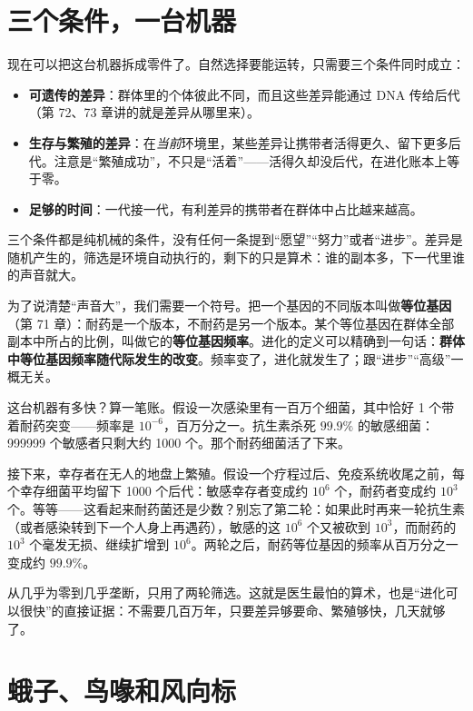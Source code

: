 \section{三个条件，一台机器}

现在可以把这台机器拆成零件了。自然选择要能运转，只需要三个条件同时成立：

\begin{itemize}[itemsep=2pt]
\item \textbf{可遗传的差异}：群体里的个体彼此不同，而且这些差异能通过 DNA 传给后代（第 72、73 章讲的就是差异从哪里来）。
\item \textbf{生存与繁殖的差异}：在\emph{当前}环境里，某些差异让携带者活得更久、留下更多后代。注意是“繁殖成功”，不只是“活着”——活得久却没后代，在进化账本上等于零。
\item \textbf{足够的时间}：一代接一代，有利差异的携带者在群体中占比越来越高。
\end{itemize}

三个条件都是纯机械的条件，没有任何一条提到“愿望”“努力”或者“进步”。差异是随机产生的，筛选是环境自动执行的，剩下的只是算术：谁的副本多，下一代里谁的声音就大。

为了说清楚“声音大”，我们需要一个符号。把一个基因的不同版本叫做\textbf{等位基因}（第 71 章）：耐药是一个版本，不耐药是另一个版本。某个等位基因在群体全部副本中所占的比例，叫做它的\textbf{等位基因频率}。进化的定义可以精确到一句话：\textbf{群体中等位基因频率随代际发生的改变}。频率变了，进化就发生了；跟“进步”“高级”一概无关。

\begin{qiaoliang}
这台机器有多快？算一笔账。假设一次感染里有一百万个细菌，其中恰好 1 个带着耐药突变——频率是 $10^{-6}$，百万分之一。抗生素杀死 $99.9\%$ 的敏感细菌：999999 个敏感者只剩大约 1000 个。那个耐药细菌活了下来。

接下来，幸存者在无人的地盘上繁殖。假设一个疗程过后、免疫系统收尾之前，每个幸存细菌平均留下 1000 个后代：敏感幸存者变成约 $10^6$ 个，耐药者变成约 $10^3$ 个。等等——这看起来耐药菌还是少数？别忘了第二轮：如果此时再来一轮抗生素（或者感染转到下一个人身上再遇药），敏感的这 $10^6$ 个又被砍到 $10^3$，而耐药的 $10^3$ 个毫发无损、继续扩增到 $10^6$。两轮之后，耐药等位基因的频率从百万分之一变成约 $99.9\%$。

从几乎为零到几乎垄断，只用了两轮筛选。这就是医生最怕的算术，也是“进化可以很快”的直接证据：不需要几百万年，只要差异够要命、繁殖够快，几天就够了。
\end{qiaoliang}

\section{蛾子、鸟喙和风向标}

